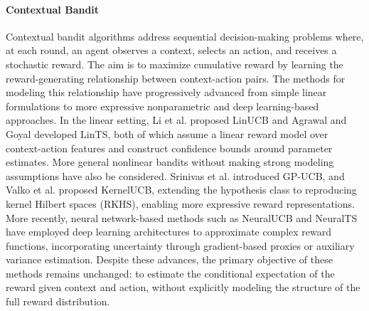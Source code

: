 \paragraph{Contextual Bandit}
Contextual bandit algorithms address sequential decision-making problems where, at each round, an agent observes a context, selects an action, and receives a stochastic reward. The aim is to maximize cumulative reward by learning the reward-generating relationship between context-action pairs.  The methods for modeling this relationship have progressively advanced from simple linear formulations to more expressive nonparametric and deep learning-based approaches. In the linear setting, Li et al.\cite{li_contextual-bandit_2010} proposed LinUCB and Agrawal and Goyal \cite{agrawal_thompson_2014} developed LinTS, both of which assume a linear reward model over context-action features and construct confidence bounds around parameter estimates. More general nonlinear bandits without making strong modeling assumptions have also be considered. Srinivas et al.\cite{srinivas_gaussian_nodate} introduced GP-UCB, and Valko et al. \cite{valko_finite-time_2013} proposed KernelUCB, extending the hypothesis class to reproducing kernel Hilbert spaces (RKHS), enabling more expressive reward representations. More recently, neural network-based methods such as NeuralUCB \cite{zhou_neural_2020} and NeuralTS \cite{zhang_neural_2021} have employed deep learning architectures to approximate complex reward functions, incorporating uncertainty through gradient-based proxies or auxiliary variance estimation. Despite these advances, the primary objective of these methods remains unchanged: to estimate the conditional expectation of the reward given context and action, without explicitly modeling the structure of the full reward distribution.